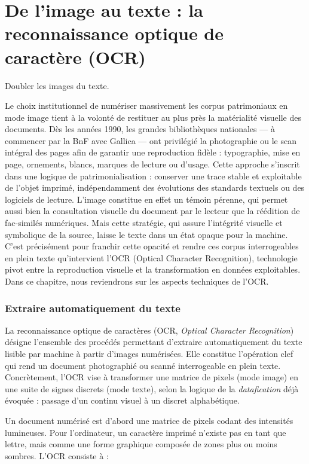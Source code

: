 \chapter{De l'image au texte : la reconnaissance optique de caractère (OCR)}

Doubler les images du texte.

Le choix institutionnel de numériser massivement les corpus patrimoniaux en mode image tient à la volonté de restituer au plus près la matérialité visuelle des documents. Dès les années 1990, les grandes bibliothèques nationales — à commencer par la BnF avec Gallica — ont privilégié la photographie ou le scan intégral des pages afin de garantir une reproduction fidèle : typographie, mise en page, ornements, blancs, marques de lecture ou d’usage. Cette approche s’inscrit dans une logique de patrimonialisation : conserver une trace stable et exploitable de l’objet imprimé, indépendamment des évolutions des standards textuels ou des logiciels de lecture. L’image constitue en effet un témoin pérenne, qui permet aussi bien la consultation visuelle du document par le lecteur que la réédition de fac-similés numériques. Mais cette stratégie, qui assure l’intégrité visuelle et symbolique de la source, laisse le texte dans un état opaque pour la machine. C’est précisément pour franchir cette opacité et rendre ces corpus interrogeables en plein texte qu’intervient l’OCR (Optical Character Recognition), technologie pivot entre la reproduction visuelle et la transformation en données exploitables. Dans ce chapitre, nous reviendrons sur les aspects techniques de l'OCR.

\subsection{Extraire automatiquement du texte}

La reconnaissance optique de caractères (OCR, \emph{Optical Character Recognition}) désigne l’ensemble des procédés permettant d’extraire automatiquement du texte lisible par machine à partir d’images numérisées. Elle constitue l’opération clef qui rend un document photographié ou scanné interrogeable en plein texte. Concrètement, l’OCR vise à transformer une matrice de pixels (mode image) en une suite de signes discrets (mode texte), selon la logique de la \emph{datafication} déjà évoquée : passage d’un continu visuel à un discret alphabétique.

Un document numérisé est d’abord une matrice de pixels codant des intensités lumineuses. Pour l’ordinateur, un caractère imprimé n’existe pas en tant que lettre, mais comme une forme graphique composée de zones plus ou moins sombres. L’OCR consiste à :

